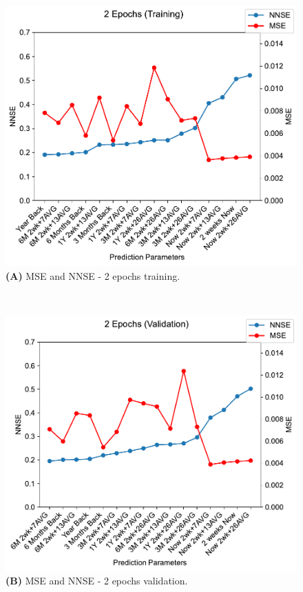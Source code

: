 \documentclass[utf8]{FrontiersinVancouver} %
\begin{document}




\begin{figure}[htb]

  \begin{center}

     \begin{minipage}[b]{0.45\textwidth}
       \includegraphics[width=1.0\linewidth]{images/2_training-MSE-and-NNSE.pdf}
        {\bf (A)} MSE and NNSE - 2 epochs training.
    \end{minipage}
     \ \
     \begin{minipage}[b]{0.45\textwidth}
        \includegraphics[width=1.0\linewidth]{images/2_validation-MSE-and-NNSE.pdf}
        {\bf (B)}  MSE and NNSE - 2 epochs validation.
     \end{minipage}


\end{center}
\end{figure}
\end{document}
